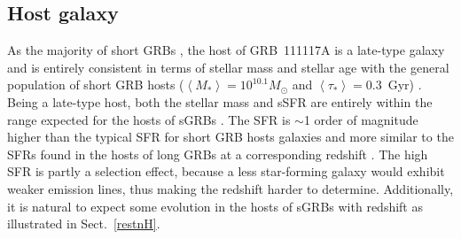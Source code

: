 \documentclass{aa}    %
\begin{document}
\subsection{Host galaxy}

As the majority of short GRBs \citep{Fong2013b}, the host of GRB~111117A is a
late-type galaxy and is entirely consistent in terms of stellar mass and stellar
age with the general population of short GRB hosts ($\left\langle M _*
\right\rangle = 10^{10.1} M_{\odot}$ and $\left\langle \tau _* \right\rangle =
0.3 $~Gyr) \citep{Leibler2010}. Being a late-type host, both the stellar mass
and sSFR are entirely within the range expected for the hosts of sGRBs
\citep{Behroozi2014}. The SFR is $\sim$1 order of magnitude higher than the
typical SFR for short GRB hosts galaxies \citep{Berger2014} and more similar to
the SFRs found in the hosts of long GRBs at a corresponding redshift
\citep{Kruhler2015}. The high SFR is partly a selection effect, because a less
star-forming galaxy would exhibit weaker emission lines, thus making the
redshift harder to determine. Additionally, it is natural to expect some
evolution in the hosts of sGRBs with redshift as illustrated in Sect.~\ref{restnH}.






\end{document}
